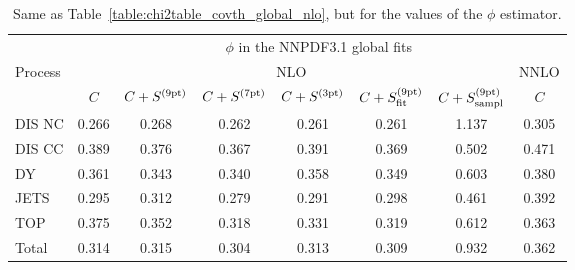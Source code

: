 \begin{table}[t]
\begin{center}
\renewcommand*{\arraystretch}{1.78}
\footnotesize
\begin{tabular}{|l|c|ccc|cc|c|}
  \toprule
  & \multicolumn{7}{c|}{$\phi$ in the NNPDF3.1 global fits}   \\
 Process & \multicolumn{6}{c|}{NLO}  & NNLO  \\
 & $C$ & $C+S^{(\rm 9pt)}$   &  $C+S^{(\rm 7pt)}$  &  $C+S^{(\rm 3pt)}$ & $C+S^{(\rm 9pt)}_{\rm fit}$ &
  $C+S^{(\rm 9pt)}_{\rm sampl}$   &  $C$ \\
\toprule
DIS NC    & 0.266  & 0.268   & 0.262 & 0.261 & 0.261 & 1.137 & 0.305 \\
DIS CC    & 0.389  & 0.376   & 0.367 & 0.391 & 0.369 & 0.502 & 0.471 \\
\midrule  
DY        & 0.361  & 0.343   & 0.340 & 0.358 & 0.349 & 0.603 & 0.380 \\
JETS      & 0.295  & 0.312   & 0.279 & 0.291 & 0.298 & 0.461 & 0.392 \\
TOP       & 0.375  & 0.352   & 0.318 & 0.331 & 0.319 & 0.612 & 0.363 \\
\midrule
Total     & 0.314  & 0.315   & 0.304 & 0.313 & 0.309 & 0.932 & 0.362 \\
\bottomrule
\end{tabular}
\end{center}
\caption{Same as Table~\ref{table:chi2table_covth_global_nlo}, but 
  for the values of the $\phi$ estimator.
  \label{table:phitable_covth_global_nlo}}
  \end{table}
